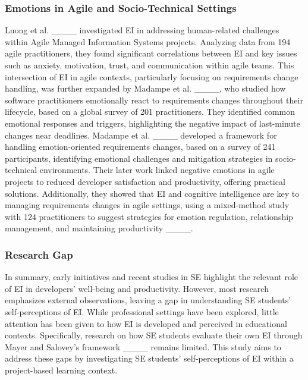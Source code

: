 \subsubsection{Emotions in Agile and Socio-Technical Settings} Luong et al. ____ investigated EI in addressing human-related challenges within Agile Managed Information Systems projects. Analyzing data from 194 agile practitioners, they found significant correlations between EI and key issues such as anxiety, motivation, trust, and communication within agile teams. This intersection of EI in agile contexts, particularly focusing on requirements change handling, was further expanded by Madampe et al. ____, who studied how software practitioners emotionally react to requirements changes throughout their lifecycle, based on a global survey of 201 practitioners. They identified common emotional responses and triggers,  highlighting the negative impact of last-minute changes near deadlines. Madampe et al. ____ developed a framework for handling emotion-oriented requirements changes, based on a survey of 241 participants, identifying emotional challenges and mitigation strategies in socio-technical environments. Their later work linked negative emotions in agile projects to reduced developer satisfaction and productivity, offering practical solutions. Additionally, they showed that EI and cognitive intelligence are key to managing requirements changes in agile settings, using a mixed-method study with 124 practitioners to suggest strategies for emotion regulation, relationship management, and maintaining productivity ____.


\subsubsection{Research Gap} 
In summary, early initiatives and recent studies in SE highlight the relevant role of EI in developers' well-being and productivity. However, most research emphasizes external observations, leaving a gap in understanding SE students' self-perceptions of EI. While professional settings have been explored, little attention has been given to how EI is developed and perceived in educational contexts. Specifically, research on how SE students evaluate their own EI through Mayer and Salovey's framework ____ remains limited. This study aims to address these gaps by investigating SE students' self-perceptions of EI within a project-based learning context.